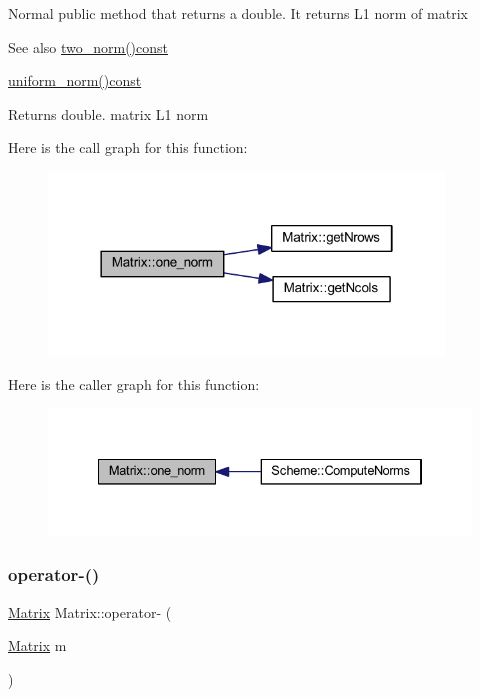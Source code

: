 Normal public method that returns a double. It returns L1 norm of matrix \begin{DoxySeeAlso}{See also}
\mbox{\hyperlink{class_matrix_aac496af05ec7aa26afc2b9c6d0ab8b66}{two\+\_\+norm()const}} 

\mbox{\hyperlink{class_matrix_a43066c7fe6418aad40170b85415063e8}{uniform\+\_\+norm()const}} 
\end{DoxySeeAlso}
\begin{DoxyReturn}{Returns}
double. matrix L1 norm 
\end{DoxyReturn}
Here is the call graph for this function\+:
\nopagebreak
\begin{figure}[H]
\begin{center}
\leavevmode
\includegraphics[width=298pt]{class_matrix_af4d468252f3ecbbcaa5726c76e332b4c_cgraph}
\end{center}
\end{figure}
Here is the caller graph for this function\+:
\nopagebreak
\begin{figure}[H]
\begin{center}
\leavevmode
\includegraphics[width=334pt]{class_matrix_af4d468252f3ecbbcaa5726c76e332b4c_icgraph}
\end{center}
\end{figure}
\mbox{\label{class_matrix_a2aabf841a4302d528f8b102c0800a263}} 
\subsubsection{\texorpdfstring{operator-\/()}{operator-()}}
{\footnotesize\ttfamily \mbox{\hyperlink{class_matrix}{Matrix}} Matrix\+::operator-\/ (\begin{DoxyParamCaption}\item[{\mbox{\hyperlink{class_matrix}{Matrix}}}]{m }\end{DoxyParamCaption})}

